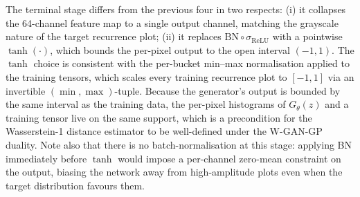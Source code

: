 
The terminal stage differs from the previous four in two respects: (i)
it collapses the 64-channel feature map to a single output channel,
matching the grayscale nature of the target recurrence plot; (ii) it
replaces $\mathrm{BN} \circ \sigma_{\mathrm{ReLU}}$ with a pointwise
$\tanh(\cdot)$, which bounds the per-pixel output to the open interval
$(-1, 1)$. The $\tanh$ choice is consistent with the per-bucket
min--max normalisation applied to the training tensors, which scales
every training recurrence plot to $[-1, 1]$ via an invertible
$(\min, \max)$-tuple. Because the generator's output is bounded by the
same interval as the training data, the per-pixel histograms of
$G_\theta(z)$ and a training tensor live on the same support, which is
a precondition for the Wasserstein-1 distance estimator to be
well-defined under the W-GAN-GP duality. Note also that there is no
batch-normalisation at this stage: applying BN immediately before
$\tanh$ would impose a per-channel zero-mean constraint on the output,
biasing the network away from high-amplitude plots even when the
target distribution favours them.
